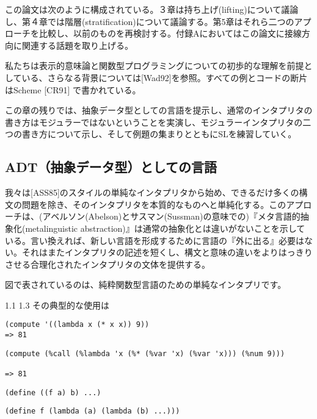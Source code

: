 \documentclass[11pt, oneside]{jsarticle}   	%
\begin{document}
この論文は次のように構成されている。３章は持ち上げ(lifting)について議論し、第４章では階層(stratification)について議論する。第5章はそれら二つのアプローチを比較し、以前のものを再検討する。付録Aにおいてはこの論文に接線方向に関連する話題を取り上げる。

私たちは表示的意味論と関数型プログラミングについての初歩的な理解を前提としている、さらなる背景については[Wad92]を参照。すべての例とコードの断片はScheme [CR91] で書かれている。

この章の残りでは、抽象データ型としての言語を提示し、通常のインタプリタの書き方はモジュラーではないということを実演し、モジュラーインタプリタの二つの書き方について示し、そして例題の集まりとともにSLを練習していく。

\subsection{ ADT（抽象データ型）としての言語}
我々は[ASS85]のスタイルの単純なインタプリタから始め、できるだけ多くの構文の問題を除き、そのインタプリタを本質的なものへと単純化する。このアプローチは、(アベルソン(Abelson)とサスマン(Sussman)の意味での)『メタ言語的抽象化(metalinguistic abstraction)』は通常の抽象化とは違いがないことを示している。言い換えれば、新しい言語を形成するために言語の『外に出る』必要はない。それはまたインタプリタの記述を短くし、構文と意味の違いをよりはっきりさせる合理化されたインタプリタの文体を提供する。

図で表されているのは、純粋関数型言語のための単純なインタプリです。

1.1 1.3 その典型的な使用は

\begin{lstlisting}
(compute '((lambda x (* x x)) 9))
=> 81
\end{lstlisting}

\begin{lstlisting}
(compute (%call (%lambda 'x (%* (%var 'x) (%var 'x))) (%num 9)))

=> 81
\end{lstlisting}

\begin{lstlisting}
(define ((f a) b) ...)
\end{lstlisting}

\newpage

\newpage


\begin{lstlisting}
(define f (lambda (a) (lambda (b) ...)))
\end{lstlisting}
\end{document}

